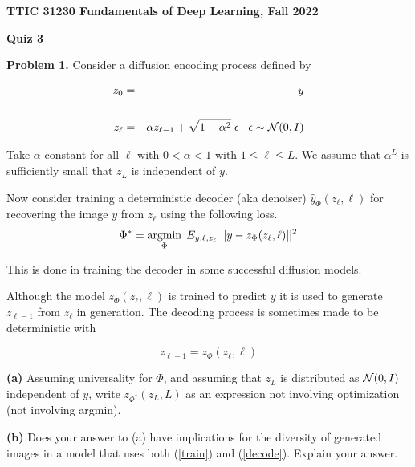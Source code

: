 \documentclass{article}
\newcommand{\solution}[1]{}
\begin{document}
\centerline{\bf TTIC 31230 Fundamentals of Deep Learning, Fall 2022}
\centerline{\bf Quiz 3}

\bigskip
{\bf Problem 1.}
Consider a diffusion encoding process defined by

\begin{eqnarray*}
  z_0 & = & y \\
  \\
  z_\ell & = & \alpha z_{\ell-1} + \sqrt{1-\alpha^2}\; \epsilon\;\;\;\epsilon\sim {\cal N}(0,I)
\end{eqnarray*}

Take $\alpha$ constant for all $\ell$ with $0 <\alpha < 1$ with $1 \leq \ell \leq L$.
We assume that $\alpha^L$ is sufficiently small that $z_L$ is independent of $y$.

\medskip
Now consider training a deterministic decoder (aka denoiser) $\hat{y}_\Phi(z_\ell,\ell)$ for recovering the image $y$ from $z_\ell$
using the following loss.
\begin{equation}
  \label{train}
  \Phi^* = \operatorname*{argmin}_{\Phi}\;E_{y,\ell,z_\ell}\;||y - z_\Phi(z_\ell,\ell)||^2
\end{equation}

This is done in training the decoder in some successful diffusion models.

\medskip
Although the model $z_\Phi(z_\ell,\ell)$ is trained to predict $y$ it is used to generate $z_{\ell-1}$ from $z_\ell$ in generation.
The decoding process is sometimes made to be deterministic with

\begin{equation}
  \label{decode}
  z_{\ell-1} = z_\Phi(z_\ell,\ell)
\end{equation}

\medskip
{\bf (a)} Assuming universality for $\Phi$, and assuming that $z_L$ is distributed as ${\cal N}(0,I)$ independent of $y$,
write $z_{\Phi^*}(z_L,L)$ as an expression not involving optimization (not involving argmin).

\solution{
  Since $z_L$ is independent of $y$, the minimizer is just the mean image.
  $$\hat{y}_{\Phi^*}(z_L,L) = E\;y$$
}

\medskip
{\bf (b)} Does your answer to (a) have implications for the diversity of generated images in a model that uses both (\ref{train}) and (\ref{decode}).  Explain your answer.

\solution{
  Part (a) gives that $z_{L-1}$ is deterministically the mean image independent of the noise $z_L$.  If all other stages in the decoding are deterministic
  then the sampler should always get the same image.
}
\end{document}
